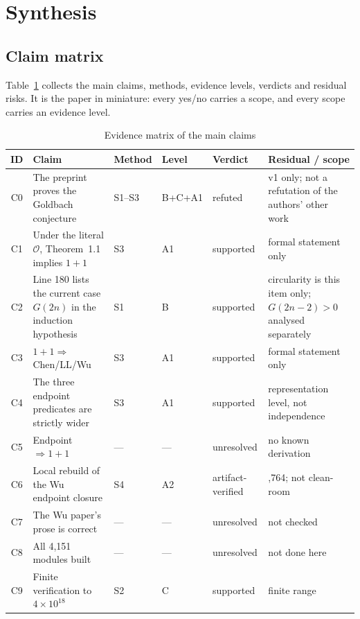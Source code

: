 \documentclass[11pt,a4paper]{article}
\theoremstyle{plain}
\theoremstyle{definition}
\begin{document}
\section{Synthesis}
\label{sec:synthesis}

\subsection{Claim matrix}
\label{sec:matrix}

Table~\ref{tab:matrix} collects the main claims, methods, evidence levels, verdicts and residual risks. It is the paper in miniature: every yes/no carries a scope, and every scope carries an evidence level.

\begin{table}[htbp]
\centering
\footnotesize
\caption{Evidence matrix of the main claims}
\label{tab:matrix}
\begin{tabularx}{\textwidth}{@{}c
>{\raggedright\arraybackslash}p{}
>{\raggedright\arraybackslash}p{}
>{\raggedright\arraybackslash}p{}
>{\raggedright\arraybackslash}p{}
>{\raggedright\arraybackslash}X@{}}
\toprule
ID & Claim & Method & Level & Verdict & Residual / scope\\
\midrule
C0 & The preprint proves the Goldbach conjecture & S1--S3 & B+C+A1 & refuted & v1 only; not a refutation of the authors' other work\\
C1 & Under the literal $\mathcal O$, Theorem~1.1 implies $1+1$ & S3 & A1 & supported & formal statement only\\
C2 & Line 180 lists the current case $G(2n)$ in the induction hypothesis & S1 & B & supported & circularity is this item only; $G(2n-2)>0$ analysed separately\\
C3 & $1+1\Rightarrow$ Chen/LL/Wu & S3 & A1 & supported & formal statement only\\
C4 & The three endpoint predicates are strictly wider & S3 & A1 & supported & representation level, not independence\\
C5 & Endpoint $\Rightarrow1+1$ & --- & --- & unresolved & no known derivation\\
C6 & Local rebuild of the Wu endpoint closure & S4 & A2 & artifact-verified & 3,764; not clean-room\\
C7 & The Wu paper's prose is correct & --- & --- & unresolved & not checked\\
C8 & All 4,151 modules built & --- & --- & unresolved & not done here\\
C9 & Finite verification to $4\times10^{18}$ & S2 & C & supported & finite range\\
\bottomrule
\end{tabularx}
\end{table}
\end{document}
